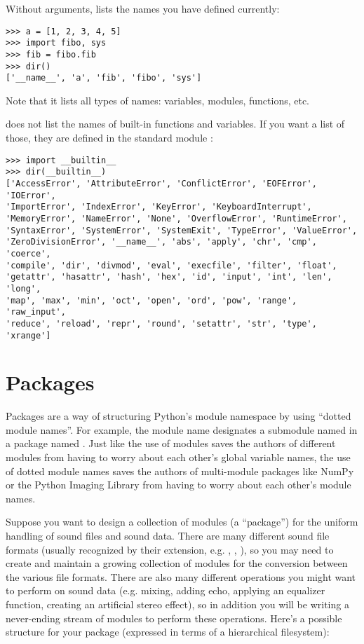 \documentclass{manual}
\begin{document}
Without arguments,  lists the names you have defined
currently:

\begin{verbatim}
>>> a = [1, 2, 3, 4, 5]
>>> import fibo, sys
>>> fib = fibo.fib
>>> dir()
['__name__', 'a', 'fib', 'fibo', 'sys']
\end{verbatim}

Note that it lists all types of names: variables, modules, functions, etc.

 does not list the names of built-in functions and
variables.  If you want a list of those, they are defined in the
standard module :

\begin{verbatim}
>>> import __builtin__
>>> dir(__builtin__)
['AccessError', 'AttributeError', 'ConflictError', 'EOFError', 'IOError',
'ImportError', 'IndexError', 'KeyError', 'KeyboardInterrupt',
'MemoryError', 'NameError', 'None', 'OverflowError', 'RuntimeError',
'SyntaxError', 'SystemError', 'SystemExit', 'TypeError', 'ValueError',
'ZeroDivisionError', '__name__', 'abs', 'apply', 'chr', 'cmp', 'coerce',
'compile', 'dir', 'divmod', 'eval', 'execfile', 'filter', 'float',
'getattr', 'hasattr', 'hash', 'hex', 'id', 'input', 'int', 'len', 'long',
'map', 'max', 'min', 'oct', 'open', 'ord', 'pow', 'range', 'raw_input',
'reduce', 'reload', 'repr', 'round', 'setattr', 'str', 'type', 'xrange']
\end{verbatim}

\section{Packages \label{packages}}

Packages are a way of structuring Python's module namespace
by using ``dotted module names''.  For example, the module name
 designates a submodule named  in a package named
.  Just like the use of modules saves the authors of different
modules from having to worry about each other's global variable names,
the use of dotted module names saves the authors of multi-module
packages like NumPy or the Python Imaging Library from having to worry
about each other's module names.

Suppose you want to design a collection of modules (a ``package'') for
the uniform handling of sound files and sound data.  There are many
different sound file formats (usually recognized by their extension,
e.g. , , ), so you may need to create
and maintain a growing collection of modules for the conversion
between the various file formats.  There are also many different
operations you might want to perform on sound data (e.g. mixing,
adding echo, applying an equalizer function, creating an artificial
stereo effect), so in addition you will be writing a never-ending
stream of modules to perform these operations.  Here's a possible
structure for your package (expressed in terms of a hierarchical
filesystem):
\end{document}
